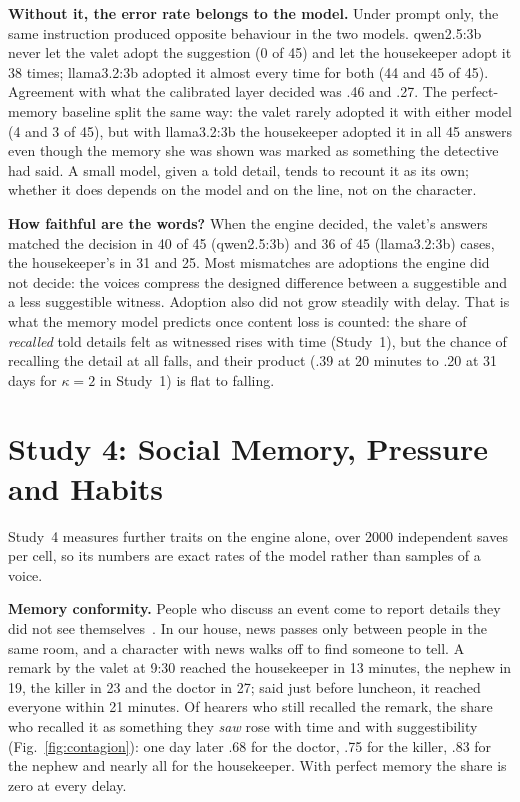 \documentclass[conference]{IEEEtran}
\begin{document}
\textbf{Without it, the error rate belongs to the model.} Under prompt only, the same instruction
produced opposite behaviour in the two models. qwen2.5:3b never let the valet adopt the suggestion
(0 of 45) and let the housekeeper adopt it 38 times; llama3.2:3b adopted it almost every time for both
(44 and 45 of 45). Agreement with what the calibrated layer decided was .46 and .27. The perfect-memory
baseline split the same way: the valet rarely adopted it with either model (4 and 3 of 45), but with
llama3.2:3b the housekeeper adopted it in all 45 answers even though the memory she was shown was
marked as something the detective had said. A small model, given a told detail, tends to recount it
as its own; whether it does depends on the model and on the line, not on the character.

\textbf{How faithful are the words?} When the engine decided, the valet's answers matched the decision
in 40 of 45 (qwen2.5:3b) and 36 of 45 (llama3.2:3b) cases, the housekeeper's in 31 and 25. Most
mismatches are adoptions the engine did not decide: the voices compress the designed difference
between a suggestible and a less suggestible witness. Adoption also did not grow steadily with delay.
That is what the memory model predicts once content loss is counted: the share of \emph{recalled} told
details felt as witnessed rises with time (Study~1), but the chance of recalling the detail at all
falls, and their product (.39 at 20 minutes to .20 at 31 days for $\kappa=2$ in Study~1) is flat to
falling.

\section{Study 4: Social Memory, Pressure and Habits}
\label{sec:study4}

Study~4 measures further traits on the engine alone, over 2000 independent saves per cell, so its
numbers are exact rates of the model rather than samples of a voice.

\textbf{Memory conformity.} People who discuss an event come to report details they did not see
themselves~\cite{gabbert2003,roediger2001social}. In our house, news passes only between people in the
same room, and a character with news walks off to find someone to tell. A remark by the valet at 9:30
reached the housekeeper in 13 minutes, the nephew in 19, the killer in 23 and the doctor in 27; said
just before luncheon, it reached everyone within 21 minutes. Of hearers who still recalled the remark,
the share who recalled it as something they \emph{saw} rose with time and with suggestibility
(Fig.~\ref{fig:contagion}): one day later .68 for the doctor, .75 for the killer, .83 for the nephew and
nearly all for the housekeeper. With perfect memory the share is zero at every delay.
\end{document}
